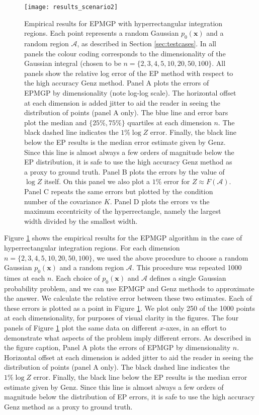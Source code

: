 \documentclass[twoside,11pt]{article}
\def\x{{\mathbf x}}
\def\regionA{\mathcal{A}}
\begin{document}
%
\begin{figure}
\centering
\hspace{0.0cm}
\texttt{[image: results\_scenario2]}
\caption{\small{Empirical results for EPMGP with hyperrectangular integration regions.  Each point represents a random Gaussian $p_0(\x)$ and a random region $\regionA$, as described in Section \ref{sec:testcases}.  In all panels the colour coding corresponds to the dimensionality of the Gaussian integral (chosen to be $n = \{2,3,4,5,10,20,50,100\}$.  All panels show the relative log error of the EP method with respect to the high accuracy Genz method.  Panel A plots the errors of EPMGP by dimensionality (note log-log scale).  The horizontal offset at each dimension is added jitter to aid the reader in seeing the distribution of points (panel A only).  The blue line and error bars plot the median and $\{25\%,75\%\}$ quartiles at each dimension $n$.  The black dashed line indicates the $1\% \log Z$ error.  Finally, the black line below the EP results is the median error estimate given by Genz.  Since this line is almost always a few orders of magnitude below the EP distribution, it is safe to use the high accuracy Genz method as a proxy to ground truth.  Panel B plots the errors by the value of $\log Z$ itself.  On this panel we also plot a $1\%$ error for $Z\approx F(\regionA)$.  Panel C repeats the same errors but plotted by the condition number of the covariance $K$.  Panel D plots the errors vs the maximum eccentricity of the hyperrectangle, namely the largest width divided by the smallest width.}}
\label{fig:axisresults} %
\end{figure}
%

Figure \ref{fig:axisresults} shows the empirical results for the EPMGP algorithm in the case of hyperrectangular integration regions.  For each dimension $n = \{2,3,4,5,10,20,50,100\}$, we used the
above procedure to choose a random Gaussian $p_0(\x)$ and a random region $\regionA$.   This procedure was repeated 1000 times at each $n$.  Each choice of $p_0(\x)$ and $\regionA$ defines a single Gaussian probability problem, and we can use EPMGP and Genz methods to approximate the answer.  We calculate the relative error between these two estimates.  Each of these errors is plotted as a point in Figure \ref{fig:axisresults}.  We plot only 250 of the 1000 points at each dimensionality, for purposes of visual clarity in the figures.  The four panels of Figure \ref{fig:axisresults} plot the same data on different $x$-axes, in an effort to demonstrate what aspects of the problem imply different errors.  As described in the figure caption, Panel A plots the errors of EPMGP by dimensionality $n$.  Horizontal offset at each dimension is added jitter to aid the reader in seeing the distribution of points (panel A only).  The black dashed line indicates the $1\% \log Z$ error.  Finally, the black line below the EP results is the median error estimate given by Genz.  Since this line is almost always a few orders of magnitude below the distribution of EP errors, it is safe to use the high accuracy Genz method as a proxy to ground truth.   
\end{document}
